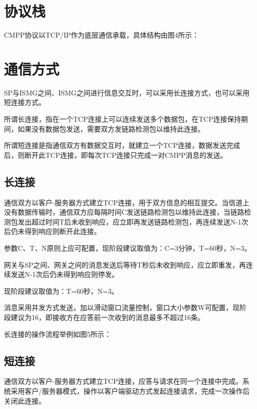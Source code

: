 \documentclass[11pt]{book} %
\begin{document}
\chapter{协议栈}

CMPP协议以TCP/IP作为底层通信承载，具体结构由图4所示：


\chapter{通信方式}

SP与ISMG之间、ISMG之间进行信息交互时，可以采用长连接方式，也可以采用短连接方式。

\begin{compactitem}
\item 所谓长连接，指在一个TCP连接上可以连续发送多个数据包，在TCP连接保持期间，如果没有数据包发送，需要双方发链路检测包以维持此连接。

\item 所谓短连接是指通信双方有数据交互时，就建立一个TCP连接，数据发送完成后，则断开此TCP连接，即每次TCP连接只完成一对CMPP消息的发送。

\end{compactitem}




\section{长连接}

通信双方以客户-服务器方式建立TCP连接，用于双方信息的相互提交。当信道上没有数据传输时，通信双方应每隔时间C发送链路检测包以维持此连接，当链路检测包发出超过时间T后未收到响应，应立即再发送链路检测包，再连续发送N-1次后仍未得到响应则断开此连接。

参数C、T、N原则上应可配置，现阶段建议取值为：C=3分钟，T=60秒，N=3。
    
网关与SP之间、网关之间的消息发送后等待T秒后未收到响应，应立即重发，再连续发送N-1次后仍未得到响应则停发。

现阶段建议取值为：T=60秒，N=3。
    
消息采用并发方式发送，加以滑动窗口流量控制，窗口大小参数W可配置，现阶段建议为16，即接收方在应答前一次收到的消息最多不超过16条。

长连接的操作流程举例如图5所示：
\section{短连接}

通信双方以客户-服务器方式建立TCP连接，应答与请求在同一个连接中完成。系统采用客户/服务器模式，操作以客户端驱动方式发起连接请求，完成一次操作后关闭此连接。
\end{document}
